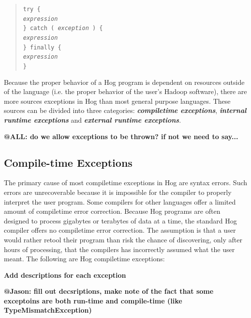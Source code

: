 \documentclass{article}
\begin{document}
\begin{quotation}
\tt try \{ \rm \\
\indent \indent \emph{expression} \\
\tt \indent \} catch ( \rm \emph{exception} \tt ) \rm \{ \\
\indent \indent \emph{expression} \\
\tt \indent \} finally \rm \{ \\
\indent \indent \emph{expression} \\
\tt \indent \}
\end{quotation}

Because the proper behavior of a Hog program is dependent on resources outside of
the language (i.e. the proper behavior of the user’s Hadoop software), there are
more sources exceptions in Hog than most general purpose languages. These sources
can be divided into three categories: \textbf{\emph{compile­time exceptions}},
\textbf{\emph{internal run­time exceptions}} and \textbf{\emph{external run­time
exceptions}}.

\textbf{@ALL: do we allow exceptions to be thrown? if not we need to say...}

\subsection{Compile-time Exceptions} %
\label{sub:compile_time_exceptions}

The primary cause of most compile­time exceptions in Hog are syntax errors. Such
errors are unrecoverable because it is impossible for the compiler to properly
interpret the user program. Some compilers for other languages offer a limited
amount of compile­time error correction. Because Hog programs are often designed
to process gigabytes or terabytes of data at a time, the standard Hog compiler
offers no compile­time error correction. The assumption is that a user would
rather re­tool their program than risk the chance of discovering, only after hours
of processing, that the compilers has incorrectly assumed what the user meant. The
following are Hog compile­time exceptions:

\textbf{Add descriptions for each exception}

\textbf{@Jason: fill out decsriptions, make note of the fact that some exceptoins are both run-time and compile-time
(like TypeMismatchException)}
\end{document}
